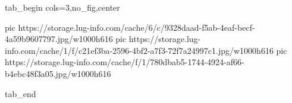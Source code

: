  
 
 
 
 


\ifcmt
  tab_begin cols=3,no_fig,center

     pic https://storage.lug-info.com/cache/6/c/9328daad-f5ab-4eaf-becf-4a59b9607797.jpg/w1000h616%
		 pic https://storage.lug-info.com/cache/1/f/c21ef3ba-2596-4bf2-a7f3-72f7a24997c1.jpg/w1000h616%
		 pic https://storage.lug-info.com/cache/f/1/780dbab5-1744-4924-af66-b4ebc48f3a05.jpg/w1000h616%

  tab_end
\fi
